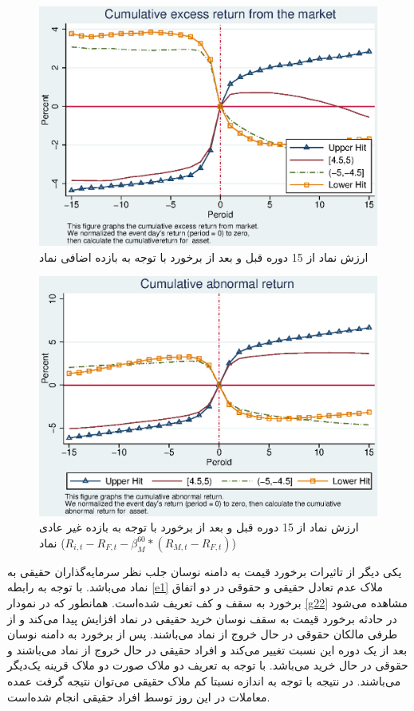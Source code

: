 \documentclass[12pt]{article}
\begin{document}
\begin{figure}[htbp]
\centering
\includegraphics[width=0.8\columnwidth]{TER.eps}
\caption{ارزش نماد از 15 دوره قبل  و بعد از برخورد با توجه به بازده اضافی نماد }
\label{g20}
\end{figure}

\begin{figure}[htbp]
\centering
\includegraphics[width=0.8\columnwidth]{TAR.eps}
\caption{ارزش نماد از 15 دوره قبل  و بعد از برخورد با توجه به بازده غیر عادی نماد
($ R_{i,t} - R_{F,t} - \beta^{60}_M * (R_{M,t} - R_{F,t}) $)
}
\label{g21}
\end{figure}







\FloatBarrier


یکی دیگر از تاثیرات برخورد قیمت به دامنه نوسان جلب نظر سرمایه‌گذاران حقیقی به نماد می‌باشد. با توجه به رابطه 
\ref{e1}
 ملاک عدم تعادل حقیقی و حقوقی 
در دو اتفاق برخورد به سقف و کف تعریف شده‌است.
 همانطور که در نمودار  
 \ref{g22}
 مشاهده می‌شود در حادثه برخورد قیمت به سقف نوسان خرید حقیقی در نماد افزایش پیدا می‌کند و از طرفی مالکان حقوقی در حال خروج از نماد می‌باشند. پس از برخورد به دامنه نوسان بعد از یک دوره این نسبت تغییر می‌کند و افراد حقیقی در حال خروج از نماد می‌باشند و حقوقی در حال خرید می‌باشد. با توجه به تعریف دو ملاک صورت دو ملاک قرینه یک‌دیگر می‌باشند. در نتیجه با توجه به اندازه نسبتا کم ملاک حقیقی می‌توان نتیجه گرفت عمده معاملات در این روز توسط افراد حقیقی انجام شده‌است. 
 
\end{document}
